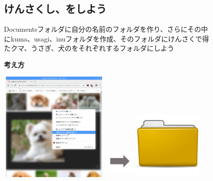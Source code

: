 \documentclass[a4paper,12pt]{jarticle}
\begin{document}
\begin{figure}[t]
  \subsection{\theExercise 
    けんさくし、をしよう}
  Documentsフォルダに自分の名前のフォルダを作り、さらにその中にkuma、usagi、inuフォルダを作成、そのフォルダにけんさくで得たクマ、うさぎ、犬のをそれぞれするフォルダにしよう

  \textbf{考え方}


  \bigskip




  \centering
  \begin{minipage}{\textwidth}
    \begin{minipage}{5.582cm}
      \includegraphics[width=5.413cm,height=5.461cm]{textbook-img092.png}
    \end{minipage}
    \begin{minipage}{3.582cm}
      \includegraphics[width=1.505cm,height=1.707cm]{textbook-img073.png}
    \end{minipage}
    \begin{minipage}{5.582cm}
      \includegraphics[width=3.387cm,height=3.387cm]{textbook-img044.png}
    \end{minipage}
  \end{minipage}



\end{figure}
\end{document}
